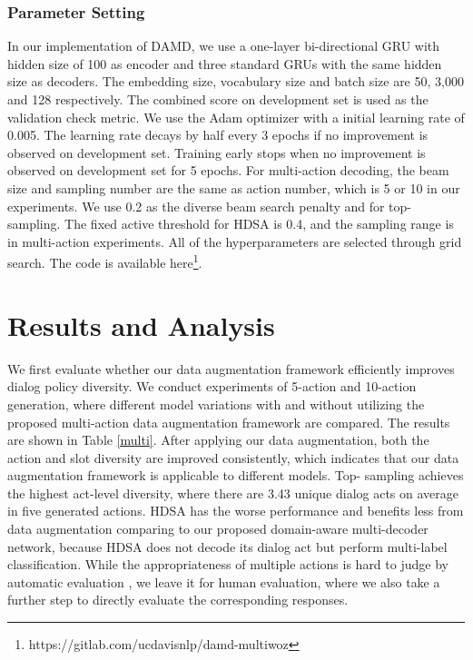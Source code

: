 \documentclass[letterpaper]{article} \usepackage{aaai20}  \usepackage{times}  \usepackage{helvet} \usepackage{courier}  \usepackage[hyphens]{url}  \usepackage{graphicx} \urlstyle{rm} \def\UrlFont{\rm}  \usepackage{graphicx}  \frenchspacing  \setlength{\pdfpagewidth}{8.5in}  \setlength{\pdfpageheight}{11in}  \usepackage{multirow}
\begin{document}
	\subsubsection{Parameter Setting}
	In our implementation of DAMD, we use a one-layer bi-directional GRU with hidden size of 100 as encoder and three standard GRUs with the same hidden size as decoders. The embedding size, vocabulary size and batch size are 50, 3,000 and 128 respectively. The combined score on development set is used as the validation check metric. We use the Adam optimizer with a initial learning rate of 0.005. The learning rate decays by half every 3 epochs if no improvement is observed on development set. Training early stops when no improvement is observed on development set for 5 epochs. For multi-action decoding, the beam size and sampling number  are the same as action number, which is 5 or 10 in our experiments. We use 0.2 as the diverse beam search penalty and   for top- sampling. The fixed active threshold for HDSA is 0.4, and the sampling range is  in multi-action experiments. All of the hyperparameters are selected through grid search. The code is available here\footnote{https://gitlab.com/ucdavisnlp/damd-multiwoz}.
	
	
	
	
	
	\section{Results and Analysis}
	We first evaluate whether our data augmentation framework efficiently improves dialog policy diversity. We conduct experiments of 5-action and 10-action generation, where different model variations with and without utilizing the proposed multi-action data augmentation framework are compared. The results are shown in Table \ref{multi}. After applying our data augmentation, both the action and slot diversity are improved consistently, which indicates that our data augmentation framework is applicable to different models. Top- sampling achieves the highest act-level diversity, where there are 3.43 unique dialog acts on average in five generated actions. HDSA has the worse performance and benefits less from data augmentation comparing to our proposed domain-aware multi-decoder network, because HDSA does not decode its dialog act but perform multi-label classification. While the appropriateness of multiple actions is hard to judge by automatic evaluation \cite{liu2016not}, we leave it for human evaluation, where we also take a further step to directly evaluate the corresponding responses. 
	
\end{document}
